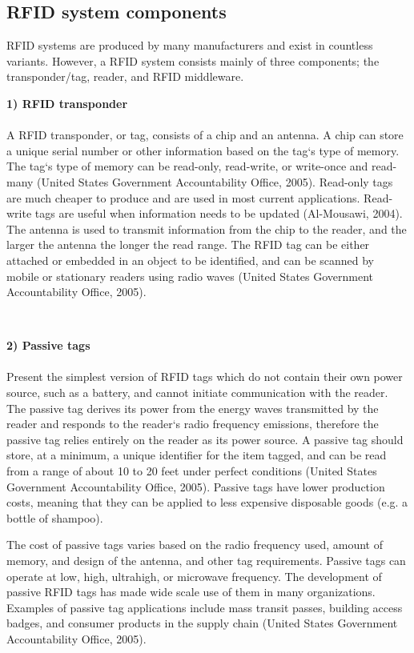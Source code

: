 \documentclass[a4paper,12pt]{article}
\begin{document}
\begin{multicols}{2}
\section{ RFID system components}
RFID systems are produced by many manufacturers and exist in countless variants. However, a RFID system consists mainly of three components; the transponder/tag, reader, and RFID middleware.
\\
\item \textbf {1)	RFID transponder}\\
\\
A RFID transponder, or tag, consists of a chip and an antenna. A chip can store a unique serial number or other information based on the tag‘s type of memory. The tag‘s type of memory can be read-only, read-write, or write-once and read-many (United States Government Accountability Office, 2005). Read-only tags are much cheaper to produce and are used in most current applications. Read-write tags are useful when information needs to be updated (Al-Mousawi, 2004). The antenna is used to transmit information from the chip to the reader, and the larger the antenna the longer the read range. The RFID tag can be either attached or embedded in an object to be identified, and can be scanned by mobile or stationary readers using radio waves (United States Government Accountability Office, 2005).


\\
\item \textbf {2)	Passive tags}\\
\\
Present the simplest version of RFID tags which do not contain their own power source, such as a battery, and cannot initiate communication with the reader. The passive tag derives its power from the energy waves transmitted by the reader and responds to the reader‘s radio frequency emissions, therefore the passive tag relies entirely on the reader as its power source. A passive tag should store, at a minimum, a unique identifier for the item tagged, and can be read from a range of about 10 to 20 feet under perfect conditions (United States Government Accountability Office, 2005). Passive tags have lower production costs, meaning that they can be applied to less expensive disposable goods (e.g. a bottle of shampoo).

The cost of passive tags varies based on the radio frequency used, amount of memory, and design of the antenna, and other tag requirements. Passive tags can operate at low, high, ultrahigh, or microwave frequency. The development of passive RFID tags has made wide scale use of them in many organizations. Examples of passive tag applications include mass transit passes, building access badges, and consumer products in the supply chain (United States Government Accountability Office, 2005).



\end{multicols}
\end{document}
